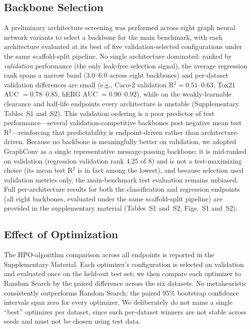 \documentclass[journal]{IEEEtran}
\begin{document}
\subsection{Backbone Selection}
\label{sec:arch_selection}

A preliminary architecture screening was performed across eight graph neural network variants to select a backbone for the main benchmark, with each architecture evaluated at its best of five validation-selected configurations under the same scaffold-split pipeline. No single architecture dominated: ranked by \emph{validation} performance (the only leak-free selection signal), the average regression rank spans a narrow band ($3.0$--$6.0$ across eight backbones) and per-dataset validation differences are small (e.g., Caco-2 validation R$^2 = 0.51$--$0.63$, Tox21 AUC $= 0.78$--$0.85$, hERG AUC $= 0.90$--$0.92$), while on the weakly-learnable clearance and half-life endpoints every architecture is unstable (Supplementary Tables~S1 and~S2). This validation ordering is a poor predictor of test performance---several validation-competitive backbones post negative mean test R$^2$---reinforcing that predictability is endpoint-driven rather than architecture-driven. Because no backbone is meaningfully better on validation, we adopted GraphConv as a single representative message-passing backbone; it is mid-ranked on validation (regression validation rank $4.25$ of $8$) and is not a test-maximizing choice (its mean test R$^2$ is in fact among the lowest), and because selection used validation metrics only, the main-benchmark test evaluation remains unbiased. Full per-architecture results for both the classification and regression endpoints (all eight backbones, evaluated under the same scaffold-split pipeline) are provided in the supplementary material (Tables~S1 and~S2, Figs.~S1 and~S2).

\subsection{Effect of Optimization}
\label{sec:optimization}

The HPO-algorithm comparison across all endpoints is reported in the Supplementary Material. Each optimizer's configuration is selected on validation and evaluated once on the held-out test set; we then compare each optimizer to Random Search by the paired difference across the six datasets. No metaheuristic consistently outperforms Random Search: the paired 95\% bootstrap confidence intervals span zero for every optimizer. We deliberately do not name a single ``best'' optimizer per dataset, since such per-dataset winners are not stable across seeds and must not be chosen using test data.
\end{document}
